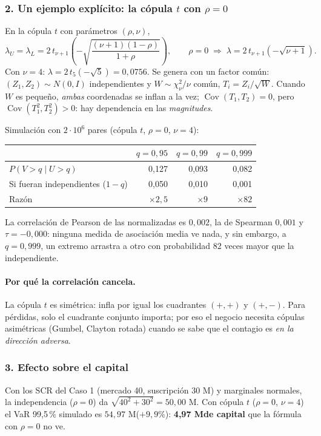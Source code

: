 \documentclass[a4paper,12pt]{article}
\newcommand{\euro}{\texteuro}
\begin{document}
\subsubsection*{2. Un ejemplo explícito: la cópula $t$ con $\rho=0$}
En la cópula $t$ con parámetros $(\rho,\nu)$,
\[
\lambda_U=\lambda_L=2\,t_{\nu+1}\!\left(-\sqrt{\frac{(\nu+1)(1-\rho)}{1+\rho}}\right),\qquad
\rho=0\;\Rightarrow\;\lambda=2\,t_{\nu+1}(-\sqrt{\nu+1}).
\]
Con $\nu=4$: $\lambda=2\,t_5(-\sqrt5)=0{,}0756$. Se genera con un factor común: $(Z_1,Z_2)\sim N(0,I)$ independientes y $W\sim\chi^2_\nu/\nu$ común, $T_i=Z_i/\sqrt W$. Cuando $W$ es pequeño, \emph{ambas} coordenadas se inflan a la vez; $\operatorname{Cov}(T_1,T_2)=0$, pero $\operatorname{Cov}(T_1^2,T_2^2)>0$: hay dependencia en las \emph{magnitudes}.

Simulación con $2\cdot10^6$ pares (cópula $t$, $\rho=0$, $\nu=4$):
\begin{center}
\small
\begin{tabular}{lrrr}
\toprule
 & $q=0{,}95$ & $q=0{,}99$ & $q=0{,}999$\\
\midrule
$P(V>q\mid U>q)$ & 0,127 & 0,093 & 0,082\\
Si fueran independientes ($1-q$) & 0,050 & 0,010 & 0,001\\
Razón & $\times2{,}5$ & $\times9$ & $\times82$\\
\bottomrule
\end{tabular}
\end{center}
La correlación de Pearson de las normalizadas es $0{,}002$, la de Spearman $0{,}001$ y $\tau=-0{,}000$: ninguna medida de asociación media ve nada, y sin embargo, a $q=0{,}999$, un extremo arrastra a otro con probabilidad 82 veces mayor que la independiente.

\paragraph{Por qué la correlación cancela.} La cópula $t$ es simétrica: infla por igual los cuadrantes $(+,+)$ y $(+,-)$. Para pérdidas, solo el cuadrante conjunto importa; por eso el negocio necesita cópulas asimétricas (Gumbel, Clayton rotada) cuando se sabe que el contagio es \emph{en la dirección adversa}.

\subsubsection*{3. Efecto sobre el capital}
Con los SCR del Caso 1 (mercado 40, suscripción 30 M\euro) y marginales normales, la independencia ($\rho=0$) da $\sqrt{40^2+30^2}=50{,}00$ M\euro. Con cópula $t$ ($\rho=0$, $\nu=4$) el VaR 99,5\,\% simulado es $54{,}97$ M\euro ($+9{,}9\%$): \textbf{4,97 M\euro de capital} que la fórmula con $\rho=0$ no ve.
\end{document}
